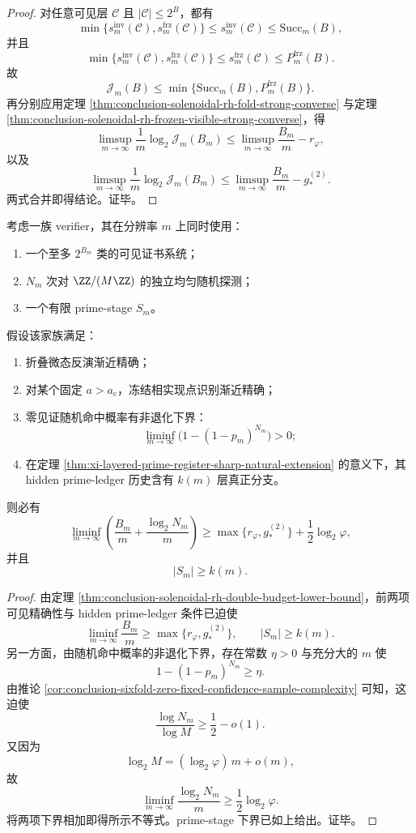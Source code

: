 \begin{proof}
对任意可见层 \(\mathcal C\) 且 \(|\mathcal C|\le 2^B\)，都有
\[
\min\!\bigl\{s_m^{\mathrm{inv}}(\mathcal C),s_m^{\mathrm{frz}}(\mathcal C)\bigr\}
\le
s_m^{\mathrm{inv}}(\mathcal C)\le \mathrm{Succ}_m(B),
\]
并且
\[
\min\!\bigl\{s_m^{\mathrm{inv}}(\mathcal C),s_m^{\mathrm{frz}}(\mathcal C)\bigr\}
\le
s_m^{\mathrm{frz}}(\mathcal C)\le P_m^{\mathrm{frz}}(B).
\]
故
\[
\mathcal J_m(B)\le \min\!\bigl\{\mathrm{Succ}_m(B),P_m^{\mathrm{frz}}(B)\bigr\}.
\]
再分别应用定理 \ref{thm:conclusion-solenoidal-rh-fold-strong-converse} 与定理 \ref{thm:conclusion-solenoidal-rh-frozen-visible-strong-converse}，得
\[
\limsup_{m\to\infty}\frac1m\log_2 \mathcal J_m(B_m)
\le
\limsup_{m\to\infty}\frac{B_m}{m}-r_\varphi,
\]
以及
\[
\limsup_{m\to\infty}\frac1m\log_2 \mathcal J_m(B_m)
\le
\limsup_{m\to\infty}\frac{B_m}{m}-g_*^{(2)}.
\]
两式合并即得结论。证毕。
\end{proof}

\begin{theorem}[三预算加法律]\label{thm:conclusion-solenoidal-rh-three-budget-additive-law}
考虑一族 verifier，其在分辨率 \(m\) 上同时使用：
\begin{enumerate}
  \item 一个至多 \(2^{B_m}\) 类的可见证书系统；
  \item \(N_m\) 次对 \(\ZZ/(M\ZZ)\) 的独立均匀随机探测；
  \item 一个有限 prime-stage \(S_m\)。
\end{enumerate}
假设该家族满足：
\begin{enumerate}
  \item 折叠微态反演渐近精确；
  \item 对某个固定 \(a>a_{\mathrm c}\)，冻结相实现点识别渐近精确；
  \item 零见证随机命中概率有非退化下界：
  \[
  \liminf_{m\to\infty}\bigl(1-(1-p_m)^{N_m}\bigr)>0;
  \]
  \item 在定理 \ref{thm:xi-layered-prime-register-sharp-natural-extension} 的意义下，其 hidden prime-ledger 历史含有 \(k(m)\) 层真正分支。
\end{enumerate}
则必有
\[
\liminf_{m\to\infty}
\left(
\frac{B_m}{m}
+
\frac{\log_2 N_m}{m}
\right)
\ge
\max\!\bigl\{r_\varphi,g_*^{(2)}\bigr\}
+
\frac12\log_2\varphi,
\]
并且
\[
|S_m|\ge k(m).
\]
\end{theorem}

\begin{proof}
由定理 \ref{thm:conclusion-solenoidal-rh-double-budget-lower-bound}，前两项可见精确性与 hidden prime-ledger 条件已迫使
\[
\liminf_{m\to\infty}\frac{B_m}{m}\ge \max\!\bigl\{r_\varphi,g_*^{(2)}\bigr\},
\qquad
|S_m|\ge k(m).
\]
另一方面，由随机命中概率的非退化下界，存在常数 \(\eta>0\) 与充分大的 \(m\) 使
\[
1-(1-p_m)^{N_m}\ge \eta.
\]
由推论 \ref{cor:conclusion-sixfold-zero-fixed-confidence-sample-complexity} 可知，这迫使
\[
\frac{\log N_m}{\log M}\ge \frac12-o(1).
\]
又因为
\[
\log_2 M=(\log_2\varphi)\,m+o(m),
\]
故
\[
\liminf_{m\to\infty}\frac{\log_2 N_m}{m}\ge \frac12\log_2\varphi.
\]
将两项下界相加即得所示不等式。prime-stage 下界已如上给出。证毕。
\end{proof}


